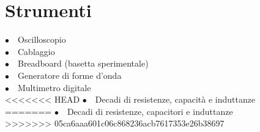 

\section{Strumenti}

$\bullet \quad$Oscilloscopio \\
$\bullet \quad$Cablaggio\\
$\bullet \quad$Breadboard (basetta sperimentale)\\
$\bullet \quad$Generatore di forme d'onda\\
$\bullet \quad$Multimetro digitale\\
<<<<<<< HEAD
$\bullet \quad$Decadi di resistenze, capacità e induttanze\\
=======
$\bullet \quad$Decadi di resistenze, capacitori e induttanze\\
>>>>>>> 05ca6aaa601c06c868236acb7617353e26b38697
